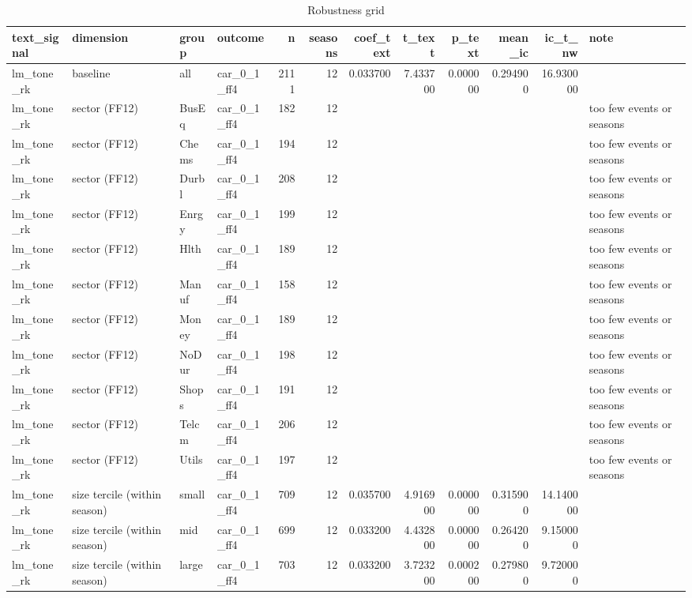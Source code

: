 \begin{table}
\caption{Robustness grid}
\label{tab:t8_robustness__validation}
\begin{tabular}{llllrrrrrrrl}
\toprule
text\_signal & dimension & group & outcome & n & seasons & coef\_text & t\_text & p\_text & mean\_ic & ic\_t\_nw & note \\
\midrule
lm\_tone\_rk & baseline & all & car\_0\_1\_ff4 & 2111 & 12 & 0.033700 & 7.433700 & 0.000000 & 0.294900 & 16.930000 &  \\
lm\_tone\_rk & sector (FF12) & BusEq & car\_0\_1\_ff4 & 182 & 12 &  &  &  &  &  & too few events or seasons \\
lm\_tone\_rk & sector (FF12) & Chems & car\_0\_1\_ff4 & 194 & 12 &  &  &  &  &  & too few events or seasons \\
lm\_tone\_rk & sector (FF12) & Durbl & car\_0\_1\_ff4 & 208 & 12 &  &  &  &  &  & too few events or seasons \\
lm\_tone\_rk & sector (FF12) & Enrgy & car\_0\_1\_ff4 & 199 & 12 &  &  &  &  &  & too few events or seasons \\
lm\_tone\_rk & sector (FF12) & Hlth & car\_0\_1\_ff4 & 189 & 12 &  &  &  &  &  & too few events or seasons \\
lm\_tone\_rk & sector (FF12) & Manuf & car\_0\_1\_ff4 & 158 & 12 &  &  &  &  &  & too few events or seasons \\
lm\_tone\_rk & sector (FF12) & Money & car\_0\_1\_ff4 & 189 & 12 &  &  &  &  &  & too few events or seasons \\
lm\_tone\_rk & sector (FF12) & NoDur & car\_0\_1\_ff4 & 198 & 12 &  &  &  &  &  & too few events or seasons \\
lm\_tone\_rk & sector (FF12) & Shops & car\_0\_1\_ff4 & 191 & 12 &  &  &  &  &  & too few events or seasons \\
lm\_tone\_rk & sector (FF12) & Telcm & car\_0\_1\_ff4 & 206 & 12 &  &  &  &  &  & too few events or seasons \\
lm\_tone\_rk & sector (FF12) & Utils & car\_0\_1\_ff4 & 197 & 12 &  &  &  &  &  & too few events or seasons \\
lm\_tone\_rk & size tercile (within season) & small & car\_0\_1\_ff4 & 709 & 12 & 0.035700 & 4.916900 & 0.000000 & 0.315900 & 14.140000 &  \\
lm\_tone\_rk & size tercile (within season) & mid & car\_0\_1\_ff4 & 699 & 12 & 0.033200 & 4.432800 & 0.000000 & 0.264200 & 9.150000 &  \\
lm\_tone\_rk & size tercile (within season) & large & car\_0\_1\_ff4 & 703 & 12 & 0.033200 & 3.723200 & 0.000200 & 0.279800 & 9.720000 &  \\

\end{tabular}
\end{table}
